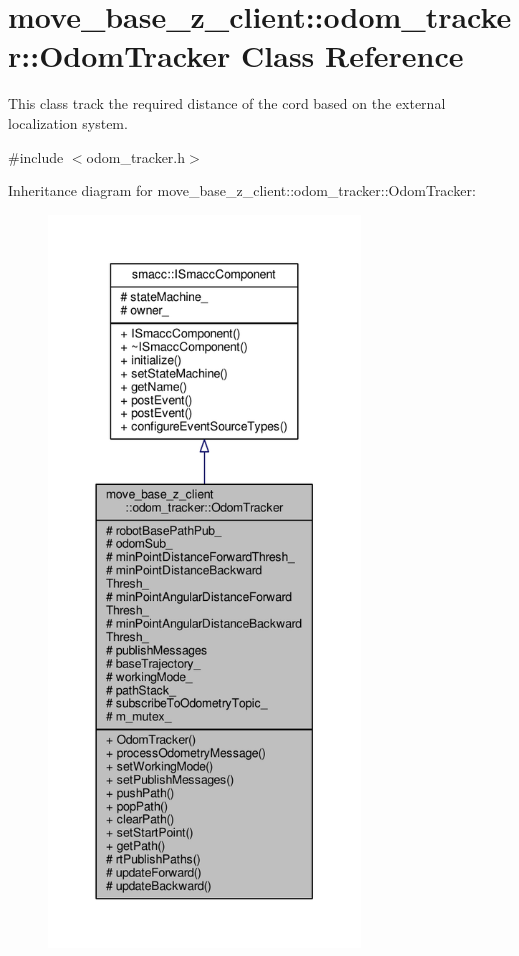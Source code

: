 \hypertarget{classmove__base__z__client_1_1odom__tracker_1_1OdomTracker}{}\section{move\+\_\+base\+\_\+z\+\_\+client\+:\+:odom\+\_\+tracker\+:\+:Odom\+Tracker Class Reference}
\label{classmove__base__z__client_1_1odom__tracker_1_1OdomTracker}


This class track the required distance of the cord based on the external localization system.  




{\ttfamily \#include $<$odom\+\_\+tracker.\+h$>$}



Inheritance diagram for move\+\_\+base\+\_\+z\+\_\+client\+:\+:odom\+\_\+tracker\+:\+:Odom\+Tracker\+:\nopagebreak
\begin{figure}[H]
\begin{center}
\leavevmode
\includegraphics[height=550pt]{classmove__base__z__client_1_1odom__tracker_1_1OdomTracker__inherit__graph}
\end{center}
\end{figure}


